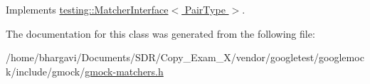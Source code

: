 Implements \hyperlink{classtesting_1_1_matcher_interface_a296b43607cd99d60365f0e6a762777cf}{testing\+::\+Matcher\+Interface$<$ Pair\+Type $>$}.



The documentation for this class was generated from the following file\+:\begin{DoxyCompactItemize}
\item 
/home/bhargavi/\+Documents/\+S\+D\+R/\+Copy\+\_\+\+Exam\+\_\+X/vendor/googletest/googlemock/include/gmock/\hyperlink{gmock-matchers_8h}{gmock-\/matchers.\+h}\end{DoxyCompactItemize}
